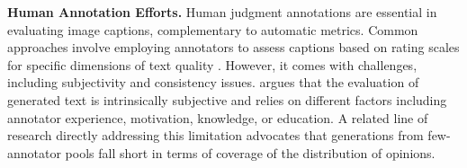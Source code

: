 \noindent \textbf{Human Annotation Efforts.} 
Human judgment annotations are essential in evaluating image captions, complementary to automatic metrics. Common approaches involve employing annotators to assess captions based on rating scales for specific dimensions of text quality \cite{gehrmann2023repairing}. However, it comes with challenges, including subjectivity and consistency issues. \citet{amidei-etal-2019-agreement} argues that the evaluation of generated text is intrinsically subjective and relies on different factors including annotator experience, motivation, knowledge, or education.  A related line of research \citep{glockner-etal-2024-ambifc, nie2020can} directly addressing this limitation advocates that generations from few-annotator pools fall short in terms of coverage of the distribution of opinions.
